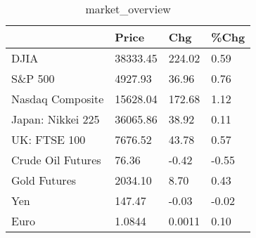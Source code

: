 \documentclass{article}%
\begin{document}
%


\begin{table}[htbp]%
\caption{market\_overview}%
\centering%
\begin{adjustbox}{width=1\textwidth}%
\begin{tabular}{llll}
\toprule
                  &    Price &    Chg &  \%Chg \\
\midrule
             DJIA & 38333.45 & 224.02 &  0.59 \\
          S\&P 500 &  4927.93 &  36.96 &  0.76 \\
 Nasdaq Composite & 15628.04 & 172.68 &  1.12 \\
Japan: Nikkei 225 & 36065.86 &  38.92 &  0.11 \\
     UK: FTSE 100 &  7676.52 &  43.78 &  0.57 \\
Crude Oil Futures &    76.36 &  -0.42 & -0.55 \\
     Gold Futures &  2034.10 &   8.70 &  0.43 \\
              Yen &   147.47 &  -0.03 & -0.02 \\
             Euro &   1.0844 & 0.0011 &  0.10 \\
\bottomrule
\end{tabular}
%
\end{adjustbox}%
\end{table}

%
\end{document}

